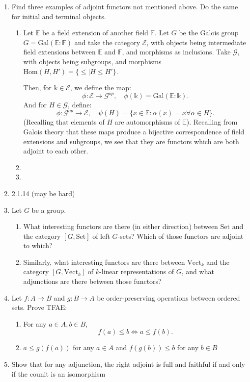 \documentclass{article}
\begin{document}
\begin{enumerate} 
    \item Find three examples of adjoint functors not mentioned above. Do the same for initial and terminal objects.
        \begin{enumerate}
            \item Let $\mathbb{E}$ be a field extension of another field $\mathbb{F}$. Let $G$ be the Galois group $G=\mathrm{Gal}(\mathbb{E}:\mathbb{F})$ and take the category $\mathcal{E}$, with objects being intermediate field extensions between $\mathbb{E}$ and $\mathbb{F}$, and morphisms as inclusions. Take $\mathcal{G}$, with objects being subgroups, and morphisms $\mathrm{Hom}(H,H')=\{\leq |H\leq H'\} $.
                
                Then, for $\mathbb{k}\in \mathcal{E}$, we define the map:
                \[
                \phi:\mathcal{E}\to \mathcal{G}^{op},\quad\phi(\mathbb{k})= \mathrm{Gal}(\mathbb{E}:\mathbb{k})
                .\] 
                And for $H\in \mathcal{G}$, define:
                \[
                \phi:\mathcal{G}^{op}\to \mathcal{E},\quad\psi(H)=\{x\in \mathbb{E}:\alpha(x)=x\forall \alpha\in H\} 
                .\] 
                (Recalling that elements of $H$ are automorphisms of $\mathbb{E}$).
                Recalling from Galois theory that these maps produce a bijective correspondence of field extensions and subgroups, we see that they are functors which are both adjoint to each other.
            \item 
            \item 
        \end{enumerate}
    \item 2.1.14 (may be hard)

    \item Let $G$ be a group.
        \begin{enumerate}
            \item What interesting functors are there (in either direction) between $\mathrm{Set}$ and the category $[G, \mathrm{Set} ]$ of left $G$-sets? Which of those functors are adjoint to which?
            \item Similarly, what interesting functors are there between $\mathrm{Vect}_k$ and the category $[G, \mathrm{Vect}_k]$ of $k$-linear representations of $G$, and what adjunctions are there between those functors?
        \end{enumerate}
    \item Let $f:A\to B$ and $g:B\to A$ be order-preserving operations between ordered sets. Prove TFAE:
        \begin{enumerate}
            \item For any $a\in A,b\in B$, 
                \[
                f(a)\leq b\iff a\leq f(b)
                .\] 
            \item $a\leq g(f(a))$ for any $a\in A$ and $f(g(b))\leq b$ for any $b\in B$
        \end{enumerate}
    \item Show that for any adjunction, the right adjoint is full and faithful if and only if the counit is an isomorphism
\end{enumerate}
\end{document}

